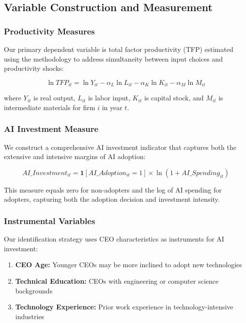 \documentclass[12pt, a4paper]{article}
\begin{document}
\subsection{Variable Construction and Measurement}

\subsubsection{Productivity Measures}

Our primary dependent variable is total factor productivity (TFP) estimated using the \citet{olley1996dynamics} methodology to address simultaneity between input choices and productivity shocks:

\begin{equation}
\ln TFP_{it} = \ln Y_{it} - \alpha_L \ln L_{it} - \alpha_K \ln K_{it} - \alpha_M \ln M_{it}
\end{equation}

where $Y_{it}$ is real output, $L_{it}$ is labor input, $K_{it}$ is capital stock, and $M_{it}$ is intermediate materials for firm $i$ in year $t$.

\subsubsection{AI Investment Measure}

We construct a comprehensive AI investment indicator that captures both the extensive and intensive margins of AI adoption:

\begin{equation}
AI\_Investment_{it} = \mathbf{1}[AI\_Adoption_{it} = 1] \times \ln(1 + AI\_Spending_{it})
\end{equation}

This measure equals zero for non-adopters and the log of AI spending for adopters, capturing both the adoption decision and investment intensity.

\subsubsection{Instrumental Variables}

Our identification strategy uses CEO characteristics as instruments for AI investment:

\begin{enumerate}
\item \textbf{CEO Age:} Younger CEOs may be more inclined to adopt new technologies
\item \textbf{Technical Education:} CEOs with engineering or computer science backgrounds
\item \textbf{Technology Experience:} Prior work experience in technology-intensive industries
\end{enumerate}
\end{document}
